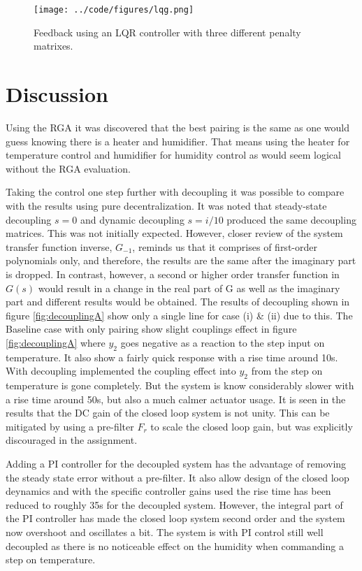 \documentclass[a4paper, titlepage]{article}
\begin{document}
\begin{figure}[H]
\center
\texttt{[image: ../code/figures/lqg.png]}
\caption{Feedback using an LQR controller with three different penalty matrixes.}
\label{fig:lqgControl}
\end{figure}


\section{Discussion}

Using the RGA it was discovered that the best pairing is the same as one would guess knowing there is a heater and humidifier.
That means using the heater for temperature control and humidifier for humidity control as would seem logical without the RGA evaluation.

Taking the control one step further with decoupling it was possible to compare with the results using pure decentralization.
It was noted that steady-state decoupling $s=0$ and dynamic decoupling $s=i/10$ produced the same decoupling matrices.
This was not initially expected.
However, closer review of the system transfer function inverse, $G_{-1}$, reminds us that it comprises of first-order polynomials only, and therefore, the results are the same after the imaginary part is dropped.
In contrast, however, a second or higher order transfer function in $G(s)$ would result in a change in the real part of G as well as the imaginary part and different results would be obtained.
The results of decoupling shown in figure \ref{fig:decouplingA} show only a single line for case (i) \& (ii) due to this.
The Baseline case with only pairing show slight couplings effect in figure \ref{fig:decouplingA} where $y_2$ goes negative as a reaction to the step input on temperature.
It also show a fairly quick response with a rise time around 10s.
With decoupling implemented the coupling effect into $y_2$ from the step on temperature is gone completely.
But the system is know considerably slower with a rise time around 50s, but also a much calmer actuator usage.
It is seen in the results that the DC gain of the closed loop system is not unity.
This can be mitigated by using a pre-filter $F_r$ to scale the closed loop gain, but was explicitly discouraged in the assignment.

Adding a PI controller for the decoupled system has the advantage of removing the steady state error without a pre-filter.
It also allow design of the closed loop deynamics and with the specific controller gains used the rise time has been reduced to roughly 35s for the decoupled system.
However, the integral part of the PI controller has made the closed loop system second order and the system now overshoot and oscillates a bit.
The system is with PI control still well decoupled as there is no noticeable effect on the humidity when commanding a step on temperature.
\end{document}
